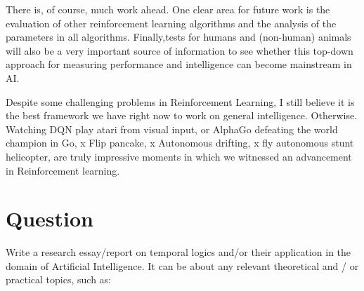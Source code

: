 \documentclass[12pt,a4paper]{article}
\begin{document}
{There is, of course, much work ahead. One clear area for future work is the
evaluation of other reinforcement learning algorithms and the analysis of the
parameters in all algorithms. Finally,tests for humans and (non-human) animals will also be a
very important source of information to see whether this top-down approach for
measuring performance and intelligence can become mainstream in AI.

Despite some challenging problems in Reinforcement Learning, I still believe it is the best framework we have right now to work on general intelligence. Otherwise. Watching DQN play atari from visual input, or AlphaGo defeating the world champion in Go, x Flip pancake, x Autonomous drifting, x fly autonomous stunt helicopter, are truly impressive  moments in which we witnessed an advancement in Reinforcement learning.
	
		
	
	



\newpage


	\section{Question}
	Write a research essay/report on temporal logics and/or their application in the domain of Artificial Intelligence. It can be about any relevant theoretical and / or practical topics, such as:
	
		\begin{itemize}
		

\end{itemize}}
\end{document}
